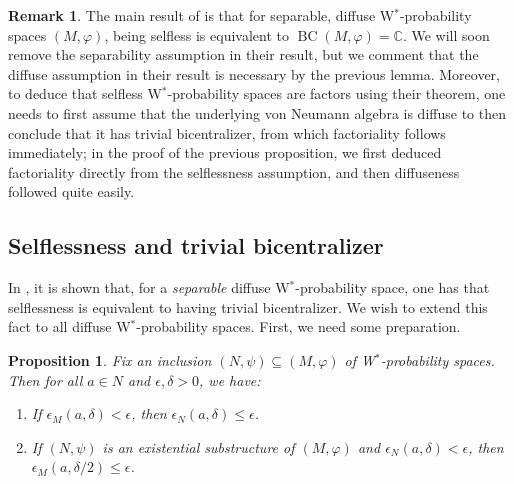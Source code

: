 \documentclass[12pt]{amsart}
\newtheorem{prop}[thm]{Proposition}
\theoremstyle{definition}
\newtheorem{remark}[thm]{Remark}
\def\bb{\mathbb}
\def\bb{\mathbb}
\def\BC{\operatorname{BC}}
\begin{document}
\begin{remark}
  The main result of \cite[Theorem A]{cyrilamine} is that for separable, diffuse W$^*$-probability spaces $(M,\varphi)$, being selfless is equivalent to $\BC(M,\varphi)=\bb C$.  We will soon remove the separability assumption in their result, but we comment that the diffuse assumption in their result is necessary by the previous lemma.  Moreover, to deduce that selfless W$^*$-probability spaces are factors using their theorem, one needs to first assume that the underlying von Neumann algebra is diffuse to then conclude that it has trivial bicentralizer, from which factoriality follows immediately; in the proof of the previous proposition, we first deduced factoriality directly from the selflessness assumption, and then diffuseness followed quite easily.
\end{remark}

\subsection{Selflessness and trivial bicentralizer}

In \cite{cyrilamine}, it is shown that, for a \emph{separable} diffuse W$^*$-probability space, one has that selflessness is equivalent to having trivial bicentralizer.  We wish to extend this fact to all diffuse W$^*$-probability spaces.  First, we need some preparation. 

\begin{prop}\label{upanddown}
Fix an inclusion $(N,\psi)\subseteq (M,\varphi)$ of W$^*$-probability spaces.  Then for all $a\in N$ and $\epsilon,\delta>0$, we have:
\begin{enumerate}
    \item If $\epsilon_M(a,\delta)<\epsilon$, then $\epsilon_N(a,\delta)\leq \epsilon$.
    \item If $(N,\psi)$ is an existential substructure of $(M,\varphi)$ and $\epsilon_N(a,\delta)<\epsilon$, then $\epsilon_M(a,\delta/2)\leq \epsilon$.
\end{enumerate}
\end{prop}
\end{document}
